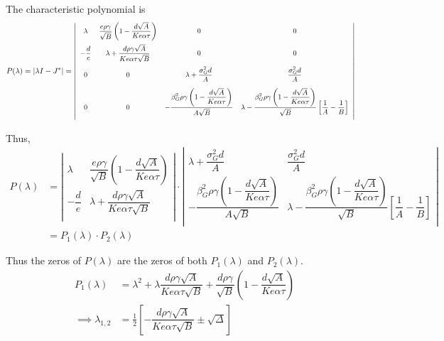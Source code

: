 \documentclass[12pt]{article}
\begin{document}
The characteristic polynomial is
\begin{align*}
	P(\lambda) &= \left|{\lambda I - J^*}\right| =
\begin{small}
\left|
	\begin{array}{cccc}
		\lambda & \dfrac{e\rho\gamma}{\sqrt{B}}\left({1-\dfrac{d\sqrt{A}}{Ke\alpha\tau}}\right) & 0 & 0 \\[.4cm]
		-\dfrac{d}{e} & \lambda+\dfrac{d\rho\gamma\sqrt{A}}{Ke\alpha\tau\sqrt{B}} & 0 & 0 \\[0.4cm]
		0 & 0 & \lambda+\dfrac{\sigma_G^2d}{A} & \dfrac{\sigma_G^2d}{A} \\[0.4cm]
		0 & 0 & -\dfrac{\beta_G^2\rho\gamma\left({1-\dfrac{d\sqrt{A}}{Ke\alpha\tau}}\right)}{A\sqrt{B}} & \lambda-\dfrac{\beta_G^2\rho\gamma\left({1-\dfrac{d\sqrt{A}}{Ke\alpha\tau}}\right)}{\sqrt{B}}\left[{\dfrac{1}{A}-\dfrac{1}{B}}\right] \\[0.4cm]
	\end{array}
	\right|
\end{small}
\end{align*}

Thus,
\begin{align*}
	P(\lambda) &= \left|
	\begin{array}{cc}
		\lambda & \dfrac{e\rho\gamma}{\sqrt{B}}\left({1-\dfrac{d\sqrt{A}}{Ke\alpha\tau}}\right) \\[.4cm]
		-\dfrac{d}{e} & \lambda+\dfrac{d\rho\gamma\sqrt{A}}{Ke\alpha\tau\sqrt{B}} \\[0.4cm]
	\end{array}
	\right| \cdot \left|
	\begin{array}{cc}
		\lambda+\dfrac{\sigma_G^2d}{A} & \dfrac{\sigma_G^2d}{A} \\[0.4cm]
-\dfrac{\beta_G^2\rho\gamma\left({1-\dfrac{d\sqrt{A}}{Ke\alpha\tau}}\right)}{A\sqrt{B}} & \lambda-\dfrac{\beta_G^2\rho\gamma\left({1-\dfrac{d\sqrt{A}}{Ke\alpha\tau}}\right)}{\sqrt{B}}\left[{\dfrac{1}{A}-\dfrac{1}{B}}\right] \\[0.4cm]
	\end{array}
	\right| \\[.2cm]
	&= P_1(\lambda)\cdot P_2(\lambda)
\end{align*}

Thus the zeros of $P(\lambda)$ are the zeros of both $P_1(\lambda)$ and $P_2(\lambda)$.
\begin{align*}
	P_1(\lambda) &= \lambda^2 + \lambda\dfrac{d\rho\gamma\sqrt{A}}{Ke\alpha\tau\sqrt{B}} + \dfrac{d\rho\gamma}{\sqrt{B}}\left({1-\dfrac{d\sqrt{A}}{Ke\alpha\tau}}\right) \\
	\implies \lambda_{1,2} &= \frac{1}{2}\left[-\dfrac{d\rho\gamma\sqrt{A}}{Ke\alpha\tau\sqrt{B}} \pm \sqrt{\Delta}\right]
\end{align*}
\end{document}
